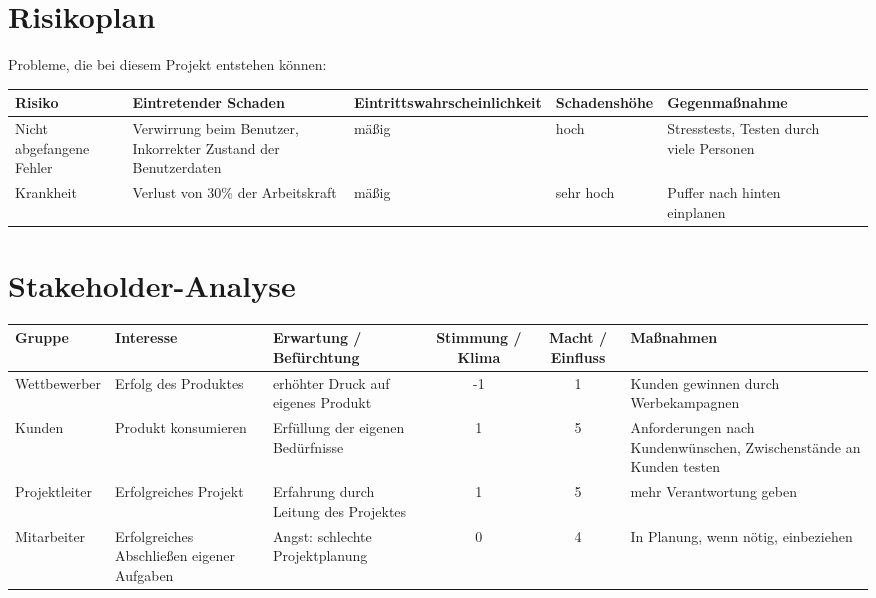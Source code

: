 %
%	

\begin{landscape}
\begin{center}
\section{Risikoplan}
Probleme, die bei diesem Projekt entstehen können:

\begin{tabulary}{1.35\textwidth}{|L|L|L|L|L|L|L|}
\hline 
\textbf{Risiko} & \textbf{Eintretender Schaden} & \textbf{Eintrittswahrscheinlichkeit} & \textbf{Schadenshöhe} & \textbf{Gegenmaßnahme} \\ 
\hline 
Nicht abgefangene Fehler & Verwirrung beim Benutzer, Inkorrekter Zustand der Benutzerdaten & mäßig & hoch & Stresstests, Testen durch viele Personen\\ 
\hline
Krankheit & Verlust von 30\% der Arbeitskraft & mäßig & sehr hoch & Puffer nach hinten einplanen \\ 
\hline
\end{tabulary}

\bigskip
\section{Stakeholder-Analyse}
\begin{tabulary}{1.35\textwidth}{|L|L|L|C|C|L|}
\hline 
\textbf{Gruppe} & \textbf{Interesse} & \textbf{Erwartung / Befürchtung} & \textbf{Stimmung / Klima} & \textbf{Macht / Einfluss} & \textbf{Maßnahmen} \\ 
\hline 
Wettbewerber & Erfolg des Produktes & erhöhter Druck auf eigenes Produkt & -1 & 1 & Kunden gewinnen durch Werbekampagnen \\ 
\hline 
Kunden & Produkt konsumieren & Erfüllung der eigenen Bedürfnisse & 1 & 5 & Anforderungen nach Kundenwünschen, Zwischenstände an Kunden testen \\ 
\hline 
Projektleiter & Erfolgreiches Projekt & Erfahrung durch Leitung des Projektes & 1 & 5 & mehr Verantwortung geben \\ 
\hline 
Mitarbeiter & Erfolgreiches Abschließen eigener Aufgaben & Angst: schlechte Projektplanung & 0 & 4 & In Planung, wenn nötig, einbeziehen \\ 
\hline
\end{tabulary} 
 

\end{center}
\end{landscape}
